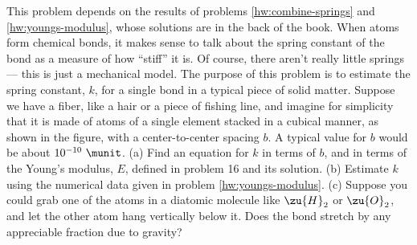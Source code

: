  This problem depends on the results of problems \ref{hw:combine-springs} and \ref{hw:youngs-modulus},
whose solutions are in the back of the book. When atoms
form chemical bonds, it makes sense to talk about the spring
constant of the bond as a measure of how ``stiff'' it is. Of
course, there aren't really little springs --- this is just
a mechanical model. The purpose of this problem is to
estimate the spring constant, $k$, for a single bond in a
typical piece of solid matter. Suppose we have a fiber, like
a hair or a piece of fishing line, and imagine for
simplicity that it is made of atoms of a single element
stacked in a cubical manner, as shown in the figure, with a
center-to-center spacing $b$. A typical value for $b$ would
be about $10^{-10}\ \munit$.\hwendpart
(a) Find an equation for $k$ in terms
of $b$, and in terms of the Young's modulus, $E$, defined in
problem 16 and its solution.\hwendpart
 (b) Estimate $k$ using the
numerical data given in problem \ref{hw:youngs-modulus}.\hwendpart
 (c) Suppose you could
grab one of the atoms in a diatomic molecule like $\zu{H}_2$ or
$\zu{O}_2$, and let the other atom hang vertically below it. Does
the bond stretch by any appreciable fraction due to gravity?
